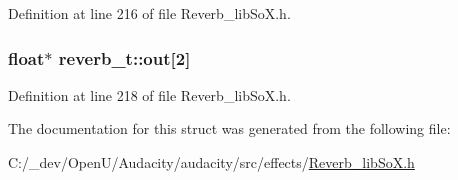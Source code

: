 Definition at line 216 of file Reverb\+\_\+lib\+So\+X.\+h.

\subsubsection[{\texorpdfstring{out}{out}}]{\setlength{\rightskip}{0pt plus 5cm}float$\ast$ reverb\+\_\+t\+::out\mbox{[}2\mbox{]}}\hypertarget{structreverb__t_a78f52a87921cb45de0dc772e0fa6fd32}{}\label{structreverb__t_a78f52a87921cb45de0dc772e0fa6fd32}


Definition at line 218 of file Reverb\+\_\+lib\+So\+X.\+h.



The documentation for this struct was generated from the following file\+:\begin{DoxyCompactItemize}
\item 
C\+:/\+\_\+dev/\+Open\+U/\+Audacity/audacity/src/effects/\hyperlink{_reverb__lib_so_x_8h}{Reverb\+\_\+lib\+So\+X.\+h}\end{DoxyCompactItemize}
